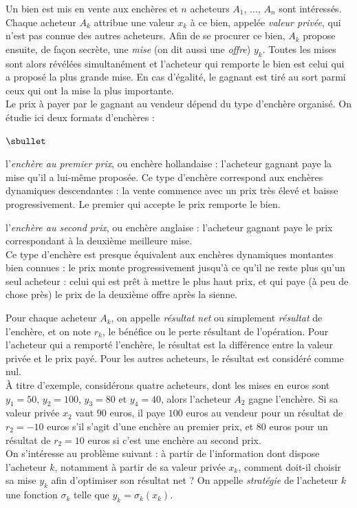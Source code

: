 \noindent
Un bien est mis en vente aux enchères et $n$ acheteurs $A_1$, $\ldots$,
$A_n$ sont intéressés. Chaque acheteur $A_k$ attribue une valeur $x_k$ 
à ce bien, appelée \emph{valeur privée}, qui n'est pas connue des 
autres acheteurs. Afin de se procurer ce bien, $A_k$ propose ensuite, 
de façon secrète, une \emph{mise} (on dit aussi une \emph{offre}) 
$y_k$. Toutes les mises sont alors révélées simultanément et l'acheteur 
qui remporte le bien est celui qui a proposé la plus grande mise. En 
cas d'égalité, le gagnant est tiré au sort parmi ceux qui ont la mise 
la plus importante.\\
Le prix à payer par le gagnant au vendeur dépend du type d'enchère 
organisé. On étudie ici deux formats d'enchères :
\begin{noliste}{$\sbullet$}
  \item l'\emph{enchère au premier prix}, ou enchère hollandaise : 
  l'acheteur gagnant paye la mise qu'il a lui-même proposée. Ce type 
  d'enchère correspond aux enchères dynamiques \og descendantes \fg{} :
  la vente commence avec un prix très élevé et baisse progressivement.
  Le premier qui accepte le prix remporte le bien.
  
  \item l'\emph{enchère au second prix}, ou enchère anglaise : 
  l'acheteur gagnant paye le prix correspondant à la deuxième meilleure
  mise.\\
  Ce type d'enchère est presque équivalent aux enchères dynamiques \og
  montantes \fg{} bien connues : le prix monte progressivement 
  jusqu'à ce qu'il ne reste plus qu'un seul acheteur : celui qui est 
  prêt à mettre le plus haut prix, et qui paye (à peu de chose près) le
  prix de la deuxième offre après la sienne.
\end{noliste}
Pour chaque acheteur $A_k$, on appelle \emph{résultat net} ou 
simplement \emph{résultat} de l'enchère, et on note $r_k$, le bénéfice 
ou le perte résultant de l'opération. Pour l'acheteur qui a remporté 
l'enchère, le résultat est la différence entre la valeur privée et le 
prix payé. Pour les autres acheteurs, le résultat est considéré comme 
nul.\\
À titre d'exemple, considérons quatre acheteurs, dont les mises en 
euros sont $y_1=50$, $y_2=100$, $y_3=80$ et $y_4=40$, alors l'acheteur 
$A_2$ gagne l'enchère. Si sa valeur privée $x_2$ vaut $90$ euros, il 
paye $100$ euros au vendeur pour un résultat de $r_2=-10$ euros s'il 
s'agit d'une enchère au premier prix, et $80$ euros pour un résultat de 
$r_2=10$ euros si c'est une enchère au second prix.\\
On s'intéresse au problème suivant : à partir de l'information dont 
dispose l'acheteur $k$, notamment à partir de sa valeur privée $x_k$, 
comment doit-il choisir sa mise $y_k$ afin d'optimiser son résultat net 
? On appelle \emph{stratégie} de l'acheteur $k$ une fonction $\sigma_k$ 
telle que $y_k = \sigma_k(x_k)$.



